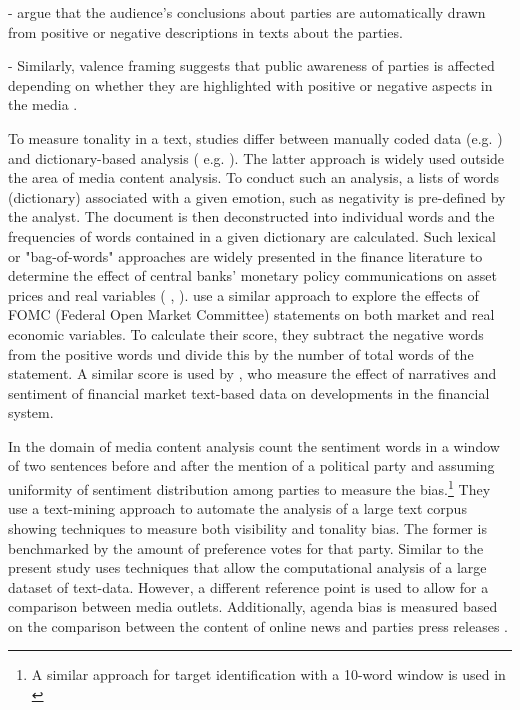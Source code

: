 \documentclass[12pt,a4paper,notitlepage]{article}
\begin{document}

- \citet{druckman_impact_2005} argue that the audience's conclusions about parties are automatically drawn from positive or negative descriptions in texts about the parties. 

- Similarly, valence framing suggests that public awareness of parties is affected depending on whether they are highlighted with positive or negative aspects in the media \citep{de_vreese_valenced_2006, hurtikova_importance_2017}.  

To measure tonality in a text, studies differ between manually coded data (e.g. \citet{eberl_one_2017}) and dictionary-based analysis ( e.g. \citep{junque_de_fortuny_media_2012}). The latter approach is widely used outside the area of media content analysis. To conduct such an analysis, a lists of words (dictionary) associated with a given emotion, such as negativity is pre-defined by the analyst. The document is then deconstructed into individual words and the frequencies of words contained in a given dictionary are calculated. Such lexical or "bag-of-words" approaches are widely presented in the finance literature to determine the effect of central banks' monetary policy communications on asset prices and real variables (\citet{nyman_news_2018} \citet{tetlock_giving_2007}, \citet{tetlock_more_2008}). \citet{hansen_shocking_2016} use a similar approach to explore the effects of FOMC (Federal Open Market Committee) statements on both market and real economic variables. To calculate their score, they subtract the negative words from the positive words und divide this by the number of total words of the statement. A similar score is used by \citet{nyman_news_2018}, who measure the effect of narratives and sentiment of financial market text-based data on developments in the financial system. 

In the domain of media content analysis \citet{junque_de_fortuny_media_2012} count the sentiment words in a window of two sentences before and after the mention of a political party and assuming uniformity of sentiment distribution among parties to measure the bias.\footnote{A similar approach for target identification with a 10-word window is used in \citet{balahur_sentiment_2013}} They use a text-mining approach to automate the analysis of a large text corpus showing techniques to measure both visibility and tonality bias. The former is benchmarked by the amount of preference votes for that party. Similar to \citet{junque_de_fortuny_media_2012} the present study uses techniques that allow the computational analysis of a large dataset of text-data. However, a different reference point is used to allow for a comparison between media outlets. Additionally, agenda bias is measured based on the comparison between the content of online news and parties press releases \citet{eberl_one_2017}.  
\end{document}
